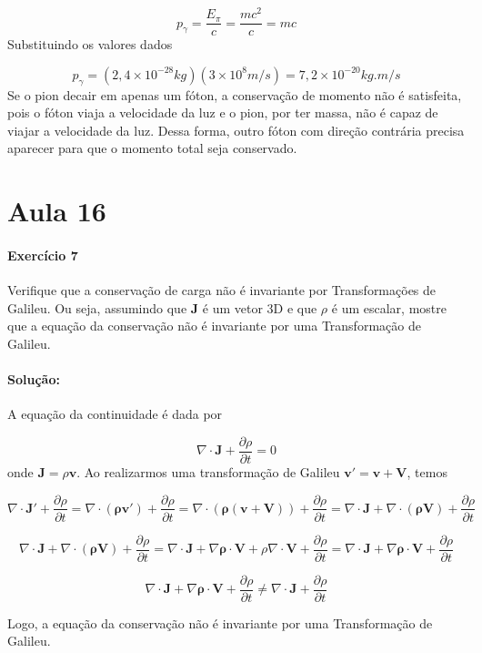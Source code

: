 \documentclass[10pt,a4paper]{article}
\begin{document}
\begin{equation}
p_{\gamma} = \frac{E_{\pi}}{c} = \frac{mc^2}{c} = mc
\end{equation}
Substituindo os valores dados 

\begin{equation}
p_{\gamma} = (2,4\times 10^{-28}\si{kg})(3\times 10^8 \unit{m/s}) = 7,2 \times 10^{-20}\si{kg.m/s}
\end{equation}
Se o pion decair em apenas um fóton, a conservação de momento não é satisfeita, pois o fóton viaja a velocidade da luz e o pion, por ter massa, não é capaz de viajar a velocidade da luz. Dessa forma, outro fóton com direção contrária precisa aparecer para que o momento total seja conservado.

\section*{Aula 16}
\paragraph{Exercício 7} Verifique que a conservação de carga não é invariante por Transformações de Galileu. Ou seja, assumindo que \textbf{J} é um vetor 3D e que $\rho$ é um escalar, mostre que a equação da conservação não é invariante por uma Transformação de Galileu.

\paragraph{Solução:} A equação da continuidade é dada por

\begin{equation*}
	\nabla\cdot\mathbf{J} + \dfrac{\partial \rho}{\partial t} = 0
\end{equation*}
onde $ \mathbf{J} = \rho\mathbf{v} $. Ao realizarmos uma transformação de Galileu $ \mathbf{v'} = \mathbf{v} + \mathbf{V} $, temos

\begin{equation*}
	\nabla\cdot\mathbf{J'} + \dfrac{\partial \rho}{\partial t} = \nabla\cdot\mathbf{(\rho\mathbf{v}')} + \dfrac{\partial \rho}{\partial t} = \nabla\cdot\mathbf{(\rho(\mathbf{v} +\mathbf{V}))} + \dfrac{\partial \rho}{\partial t} = \nabla\cdot\mathbf{J} + \nabla\cdot\mathbf{(\rho\mathbf{V})} + \dfrac{\partial \rho}{\partial t}
\end{equation*}

\begin{equation*}
	\nabla\cdot\mathbf{J} + \nabla\cdot\mathbf{(\rho\mathbf{V})} + \dfrac{\partial \rho}{\partial t} = \nabla\cdot\mathbf{J} + \nabla\mathbf{\rho}\cdot\mathbf{V} + \rho\nabla\cdot\mathbf{\mathbf{V}} + \dfrac{\partial \rho}{\partial t} = \nabla\cdot\mathbf{J} + \nabla\mathbf{\rho}\cdot\mathbf{V} + \dfrac{\partial \rho}{\partial t}
\end{equation*}

\begin{equation*}
	\nabla\cdot\mathbf{J} + \nabla\mathbf{\rho}\cdot\mathbf{V} + \dfrac{\partial \rho}{\partial t} \neq \nabla\cdot\mathbf{J} + \dfrac{\partial \rho}{\partial t}
\end{equation*}

Logo, a equação da conservação não é invariante por uma Transformação de Galileu.
\end{document}
